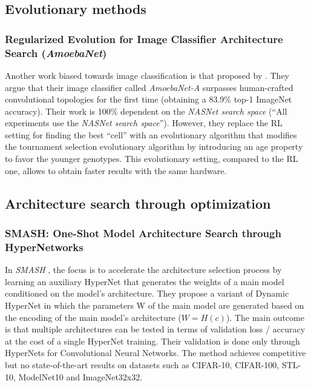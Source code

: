 \documentclass[conference]{IEEEtran}
\begin{document}
\subsection{Evolutionary methods}

\subsubsection{Regularized Evolution for Image Classifier Architecture Search (\textit{AmoebaNet})}
\label{summary:amoebanet}

Another work biased towards image classification is that proposed by \cite{Real2018}. They argue that their image classifier called \textit{AmoebaNet-A} surpasses human-crafted convolutional topologies for the first time (obtaining a 83.9\% top-1 ImageNet accuracy). Their work is 100\% dependent on the \textit{NASNet search space} \cite{Zoph2018} (“All experiments use the \textit{NASNet search space}”). However, they replace the RL setting for finding the best “cell” with an evolutionary algorithm that modifies the tournament selection evolutionary algorithm by introducing an age property to favor the younger genotypes. This evolutionary setting, compared to the RL one, allows to obtain faster results with the same hardware.

\subsection{Architecture search through optimization}

\subsubsection{SMASH: One-Shot Model Architecture Search through HyperNetworks}
\label{summary:smash}

In \textit{SMASH} \cite{brock2017smash}, the focus is to accelerate the architecture selection process by learning an auxiliary HyperNet \cite{Ha2017} that generates the weights of a main model conditioned on the model’s architecture. They propose a variant of Dynamic HyperNet in which the parameters W of the main model are generated based on the encoding of the main model’s architecture ($W=H(c)$). The main outcome is that multiple architectures can be tested in terms of validation loss / accuracy at the cost of a single HyperNet training. Their validation is done only through HyperNets for Convolutional Neural Networks. The method achieves competitive but no state-of-the-art results on datasets such as CIFAR-10, CIFAR-100, STL-10, ModelNet10 and ImageNet32x32.\\
\end{document}

